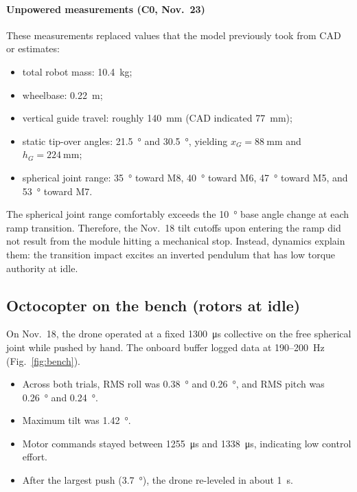 \paragraph{Unpowered measurements (C0, Nov.~23)} These measurements replaced values that the model previously took from CAD or estimates:
\begin{itemize}
  \item total robot mass: \SI{10.4}{\kilo\gram};
  \item wheelbase: \SI{0.22}{\metre};
  \item vertical guide travel: roughly \SI{140}{\milli\metre} (CAD indicated \SI{77}{\milli\metre});
  \item static tip-over angles: \SI{21.5}{\degree} and \SI{30.5}{\degree}, yielding $x_G=\SI{88}{\milli\metre}$ and $h_G=\SI{224}{\milli\metre}$;
  \item spherical joint range: \SI{35}{\degree} toward M8, \SI{40}{\degree} toward M6, \SI{47}{\degree} toward M5, and \SI{53}{\degree} toward M7.
\end{itemize}
The spherical joint range comfortably exceeds the \SI{10}{\degree} base angle change at each ramp transition. Therefore, the Nov.~18 tilt cutoffs upon entering the ramp did not result from the module hitting a mechanical stop. Instead, dynamics explain them: the transition impact excites an inverted pendulum that has low torque authority at idle.

\subsection{Octocopter on the bench (rotors at idle)}
On Nov.~18, the drone operated at a fixed \SI{1300}{\micro\second} collective on the free spherical joint while pushed by hand. The onboard buffer logged data at 190--\SI{200}{\hertz} (Fig.~\ref{fig:bench}).

\begin{itemize}
  \item Across both trials, RMS roll was \SI{0.38}{\degree} and \SI{0.26}{\degree}, and RMS pitch was \SI{0.26}{\degree} and \SI{0.24}{\degree}.
  \item Maximum tilt was \SI{1.42}{\degree}.
  \item Motor commands stayed between \SI{1255}{\micro\second} and \SI{1338}{\micro\second}, indicating low control effort.
  \item After the largest push (\SI{3.7}{\degree}), the drone re-leveled in about \SI{1}{\second}.
\end{itemize}

